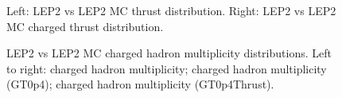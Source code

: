 \begin{figure}[H]
\centering
{}\hfill
{}\hfill %
\caption{Left: LEP2 vs LEP2 MC thrust distribution. Right: LEP2 vs LEP2 MC charged thrust distribution.}
\end{figure}

\begin{figure}[H]
\centering
{}\hfill
{}\hfill
{}\hfill
\caption{LEP2 vs LEP2 MC charged hadron multiplicity distributions. Left to right: charged hadron multiplicity; charged hadron multiplicity (GT0p4); charged hadron multiplicity (GT0p4Thrust).}
\end{figure}

